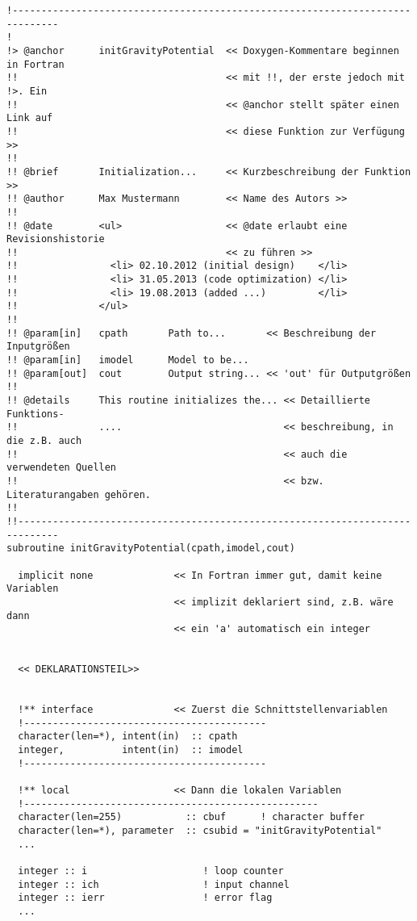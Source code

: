 \begin{verbatim}
!------------------------------------------------------------------------------
!
!> @anchor      initGravityPotential  << Doxygen-Kommentare beginnen in Fortran
!!                                    << mit !!, der erste jedoch mit !>. Ein 
!!                                    << @anchor stellt später einen Link auf  
!!                                    << diese Funktion zur Verfügung >>
!!
!! @brief       Initialization...     << Kurzbeschreibung der Funktion >>
!! @author      Max Mustermann        << Name des Autors >>
!!
!! @date        <ul>                  << @date erlaubt eine Revisionshistorie
!!                                    << zu führen >>
!!                <li> 02.10.2012 (initial design)    </li>
!!                <li> 31.05.2013 (code optimization) </li>
!!                <li> 19.08.2013 (added ...)         </li>
!!              </ul>
!!
!! @param[in]   cpath       Path to...       << Beschreibung der Inputgrößen
!! @param[in]   imodel      Model to be...
!! @param[out]  cout        Output string... << 'out' für Outputgrößen
!!
!! @details     This routine initializes the... << Detaillierte Funktions-
!!              ....                            << beschreibung, in die z.B. auch
!!                                              << auch die verwendeten Quellen
!!                                              << bzw. Literaturangaben gehören.
!!
!!-----------------------------------------------------------------------------
subroutine initGravityPotential(cpath,imodel,cout)

  implicit none              << In Fortran immer gut, damit keine Variablen
                             << implizit deklariert sind, z.B. wäre dann
                             << ein 'a' automatisch ein integer

                             
  << DEKLARATIONSTEIL>>
  
  
  !** interface              << Zuerst die Schnittstellenvariablen
  !------------------------------------------ 
  character(len=*), intent(in)  :: cpath
  integer,          intent(in)  :: imodel
  !------------------------------------------

  !** local                  << Dann die lokalen Variablen
  !---------------------------------------------------
  character(len=255)           :: cbuf      ! character buffer
  character(len=*), parameter  :: csubid = "initGravityPotential"
  ...
  
  integer :: i                    ! loop counter
  integer :: ich                  ! input channel
  integer :: ierr                 ! error flag
  ...
  

\end{verbatim}
